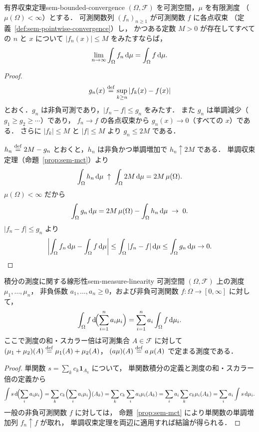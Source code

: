 \begin{theorem}{有界収束定理}{sem-bounded-convergence}
  $(\Omega, \mathcal{F})$ を可測空間，$\mu$ を有限測度
  （$\mu(\Omega) < \infty$）とする．
  可測関数列 $(f_n)_{n \geq 1}$ が可測関数 $f$ に各点収束
  （定義~\ref{def:sem-pointwise-convergence}）し，
  かつある定数 $M > 0$ が存在してすべての $n$ と $x$ について
  $|f_n(x)| \leq M$ をみたすならば，
  \[
    \lim_{n \to \infty} \int_\Omega f_n \, \mathrm{d}\mu
    = \int_\Omega f \, \mathrm{d}\mu.
  \]
\end{theorem}

\begin{proof}
  \[
    g_n(x) \overset{\mathrm{def}}{=} \sup_{k \geq n} |f_k(x) - f(x)|
  \]
  とおく．$g_n$ は非負可測であり，$|f_n - f| \leq g_n$ をみたす．
  また $g_n$ は単調減少（$g_1 \geq g_2 \geq \cdots$）であり，
  $f_n \to f$ の各点収束から $g_n(x) \to 0$（すべての $x$）である．
  さらに $|f_k| \leq M$ と $|f| \leq M$ より $g_n \leq 2M$ である．

  $h_n \overset{\mathrm{def}}{=} 2M - g_n$ とおくと，$h_n$ は非負かつ単調増加で
  $h_n \uparrow 2M$ である．
  単調収束定理（命題~\ref{prop:sem-mct}）より
  \[
    \int_\Omega h_n \, \mathrm{d}\mu
    \;\uparrow\;
    \int_\Omega 2M \, \mathrm{d}\mu
    = 2M \, \mu(\Omega).
  \]
  $\mu(\Omega) < \infty$ だから
  \[
    \int_\Omega g_n \, \mathrm{d}\mu
    = 2M \, \mu(\Omega) - \int_\Omega h_n \, \mathrm{d}\mu
    \;\to\; 0.
  \]
  $|f_n - f| \leq g_n$ より
  \[
    \left|\int_\Omega f_n \, \mathrm{d}\mu - \int_\Omega f \, \mathrm{d}\mu\right|
    \leq \int_\Omega |f_n - f| \, \mathrm{d}\mu
    \leq \int_\Omega g_n \, \mathrm{d}\mu
    \to 0.  \qedhere
  \]
\end{proof}

\begin{proposition}{積分の測度に関する線形性}{sem-measure-linearity}
  可測空間 $(\Omega, \mathcal{F})$ 上の測度 $\mu_1, \ldots, \mu_n$，
  非負係数 $a_1, \ldots, a_n \geq 0$，および非負可測関数
  $f \colon \Omega \to [0, \infty]$ に対して，
  \[
    \int_\Omega f \, \mathrm{d}\!\Bigl(\sum_{i=1}^{n} a_i \mu_i\Bigr)
    = \sum_{i=1}^{n} a_i \int_\Omega f \, \mathrm{d}\mu_i.
  \]
  ここで測度の和・スカラー倍は可測集合 $A \in \mathcal{F}$ に対して
  $(\mu_1 + \mu_2)(A) \overset{\mathrm{def}}{=} \mu_1(A) + \mu_2(A)$，
  $(a\mu)(A) \overset{\mathrm{def}}{=} a\, \mu(A)$ で定まる測度である．
\end{proposition}

\begin{proof}
  単関数 $s = \sum_{k} c_k \mathbf{1}_{A_k}$ について，
  単関数積分の定義と測度の和・スカラー倍の定義から
  \[
    \int s \, \mathrm{d}\!\Bigl(\sum_i a_i \mu_i\Bigr)
    = \sum_k c_k \Bigl(\sum_i a_i \mu_i\Bigr)(A_k)
    = \sum_k c_k \sum_i a_i \mu_i(A_k)
    = \sum_i a_i \sum_k c_k \mu_i(A_k)
    = \sum_i a_i \int s \, \mathrm{d}\mu_i.
  \]
  一般の非負可測関数 $f$ に対しては，
  命題~\ref{prop:sem-mct} により単関数の単調増加列 $f_n \uparrow f$ が取れ，
  単調収束定理を両辺に適用すれば結論が得られる．
\end{proof}


